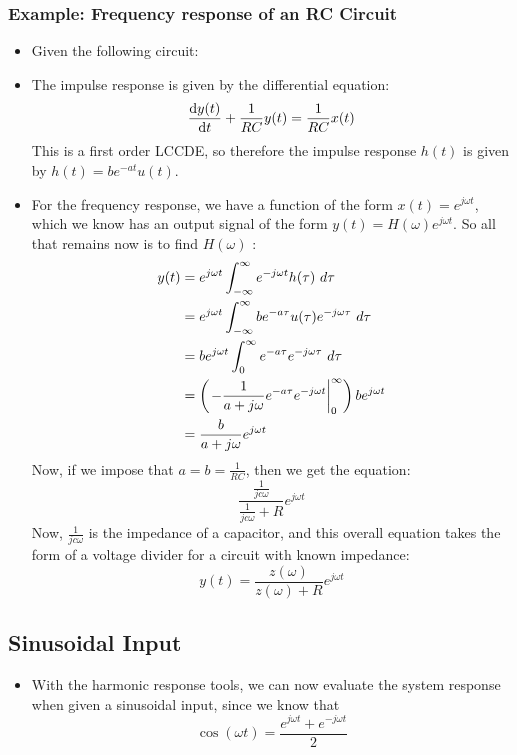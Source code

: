 \subsubsection{Example: Frequency response of an RC Circuit}
\begin{itemize}
	\item Given the following circuit:
	\item The impulse response is given by the differential equation:
		\[
			\dv{y(t)}{t} + \frac{1}{RC}y(t) = \frac{1}{RC}x(t)
		\] 
		This is a first order LCCDE, so therefore the impulse response \( h(t) \) is given by 
		\( h(t) = be^{-at}u(t) \). 
	\item For the frequency response, we have a function of the form \( x(t) = e^{j \omega t} \), 
		which we know has an output signal of the form \( y(t) = H(\omega) e^{j \omega t} \). So all that remains
		now is to find \( H(\omega) \) :
		\begin{align*}
			y(t) &= e^{j \omega t }\int_{-\infty}^{\infty} e^{-j \omega t}h(\tau) \ d  \tau \\
			&= e^{j \omega t}\int_{-\infty}^{\infty} be^{-a\tau}u(\tau) e^{-j \omega \tau}\ d \tau  \\
			&= be^{j \omega t}\int_{0}^{\infty} e^{-a \tau}e^{-j \omega \tau}\ d \tau  \\
			&= \left( \left.-\frac{1}{a + j \omega}e^{-a \tau}e^{-j \omega t}\right|_0^{\infty}\right)
				be^{j \omega t} \\
				&= \frac{b}{a + j \omega}e^{j \omega t} 
		\end{align*}
		Now, if we impose that \( a = b = \frac{1}{RC} \), then we get the equation: 
		\[
		\frac{\frac{1}{j c \omega}}{\frac{1}{j c \omega} + R}e^{ j \omega t}
		\] 
		Now, \( \frac{1}{jc\omega} \) is the impedance of a capacitor, and this overall equation takes the form of a 
		voltage divider for a circuit with known impedance: 
		\[
		y(t) = \frac{z(\omega)}{z(\omega) + R}e^{j \omega t}
		\] 
\end{itemize}
\subsection{Sinusoidal Input} 
\begin{itemize}
	\item With the harmonic response tools, we can now evaluate the system response when given a sinusoidal 
		input, since we know that 
		\[
		\cos(\omega t) = \frac{e^{ j \omega t} + e^{- j \omega t}}{2}
		\] 
\end{itemize}
